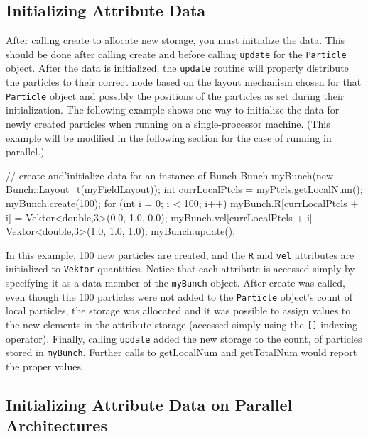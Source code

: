 \subsection{Initializing Attribute Data}

After calling create to allocate new storage, you must initialize the data. This should be done after calling create and before calling \texttt{update} for the \texttt{Particle} object. After the data is initialized, the \texttt{update} routine will properly distribute the particles to their correct node based on the layout mechanism chosen for that \texttt{Particle} object and possibly the positions of the particles as set during their initialization. The following example shows one way to initialize the data for newly
created particles when running on a single-processor machine. (This example will be modified in the following section for the case of running in parallel.) \\
\begin{code}
// create and'initialize data for an instance of Bunch 
Bunch myBunch(new Bunch::Layout\_t(myFieldLayout)); 
int currLocalPtcls = myPtcls.getLocalNum(); 
myBunch.create(100); 
for (int i = 0; i < 100; i++) { 
    myBunch.R[currLocalPtcls + i] = Vektor<double,3>(0.0, 1.0, 0.0); 
    myBunch.vel[currLocalPtcls + i] Vektor<double,3>(1.0, 1.0, 1.0); 
} 
myBunch.update(); 
\end{code}


In this example, 100 new particles are created, and the \texttt{R} and \texttt{vel} attributes are initialized to \texttt{Vektor} quantities. Notice that each attribute is accessed simply by specifying it as a data member of the \texttt{myBunch} object. After create was called, even though the 100 particles were not added to the \texttt{Particle} object's count of local particles, the storage was allocated and it was possible to assign values to the new elements in the attribute storage
(accessed simply using the \texttt{[]} indexing operator). Finally, calling \texttt{update} added the new storage to the count, of particles stored in \texttt{myBunch}. Further calls to getLocalNum and getTotalNum would report the proper values.

\subsection{Initializing Attribute Data on Parallel Architectures}

